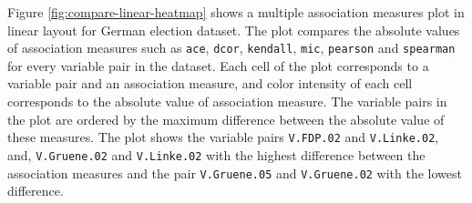 Figure \ref{fig:compare-linear-heatmap} shows a multiple association
measures plot in linear layout for German election dataset. The plot
compares the absolute values of association measures such as
\texttt{ace}, \texttt{dcor}, \texttt{kendall}, \texttt{mic},
\texttt{pearson} and \texttt{spearman} for every variable pair in the
dataset. Each cell of the plot corresponds to a variable pair and an
association measure, and color intensity of each cell corresponds to the
absolute value of association measure. The variable pairs in the plot
are ordered by the maximum difference between the absolute value of
these measures. The plot shows the variable pairs \texttt{V.FDP.02} and
\texttt{V.Linke.02}, and, \texttt{V.Gruene.02} and \texttt{V.Linke.02}
with the highest difference between the association measures and the
pair \texttt{V.Gruene.05} and \texttt{V.Gruene.02} with the lowest
difference.

